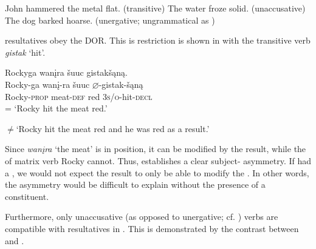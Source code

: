 \documentclass[output=paper]{LSP/langsci}
\begin{document}
\begin{exe}
\ex\label{ex:jrs:46}
\begin{xlist}
\ex John hammered the metal flat.	(transitive)
\ex The water froze solid.						(unaccusative)
\ex *The dog barked hoarse.	(unergative; ungrammatical as )
\end{xlist}
\end{exe}
	
 resultatives obey the DOR. This is restriction is shown in  with the transitive verb \textit{gistak} `hit'.

\begin{exe}
\ex\label{ex:jrs:47} 
\glll Rockyga			wan\k{i}ra			\v{s}uuc 		gistak\v{s}ąną.\\
Rocky-ga		wan\k{i}-ra		\v{s}uuc		$\varnothing$-gistak-\v{s}ąną \\
Rocky-\textsc{prop}	meat-\textsc{def}	red			\textsc{3s/o}-hit-\textsc{decl} \\
\trans = `Rocky hit the meat red.'

$\neq$`Rocky hit the meat red and he was red as a result.'
\end{exe}

Since \textit{wan\k{i}ra} `the meat' is in  position, it can be modified by the result, while the  of matrix verb Rocky cannot. Thus,  establishes a clear subject- asymmetry. If  had a , we would not expect the result to only be able to modify the . In other words, the asymmetry would be difficult to explain without the presence of a  constituent.
	
Furthermore, only unaccusative (as opposed to unergative; cf. \citealt{Perlmutter1978}) verbs are compatible with resultatives in . This is demonstrated by the contrast between  and .
\end{document}
